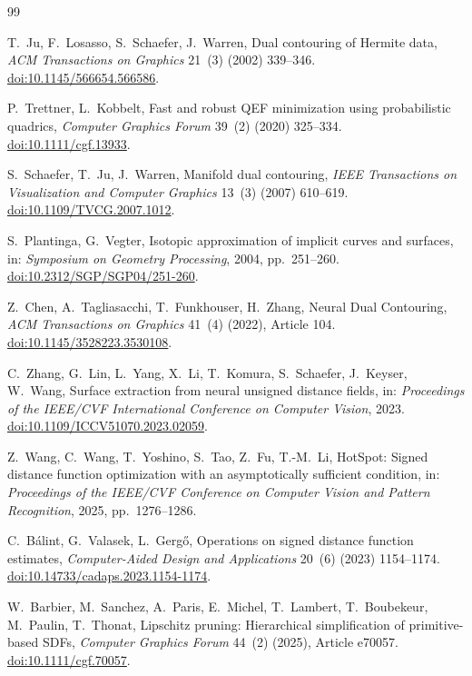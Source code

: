 \documentclass[11pt]{article}
\theoremstyle{definition}
\begin{document}
\begin{thebibliography}{99}

T.~Ju, F.~Losasso, S.~Schaefer, J.~Warren,
Dual contouring of Hermite data,
\emph{ACM Transactions on Graphics} 21~(3) (2002) 339--346.
\href{https://doi.org/10.1145/566654.566586}{doi:10.1145/566654.566586}.

P.~Trettner, L.~Kobbelt,
Fast and robust QEF minimization using probabilistic quadrics,
\emph{Computer Graphics Forum} 39~(2) (2020) 325--334.
\href{https://doi.org/10.1111/cgf.13933}{doi:10.1111/cgf.13933}.

S.~Schaefer, T.~Ju, J.~Warren,
Manifold dual contouring,
\emph{IEEE Transactions on Visualization and Computer Graphics} 13~(3)
(2007) 610--619.
\href{https://doi.org/10.1109/TVCG.2007.1012}{doi:10.1109/TVCG.2007.1012}.

S.~Plantinga, G.~Vegter,
Isotopic approximation of implicit curves and surfaces,
in: \emph{Symposium on Geometry Processing}, 2004, pp.~251--260.
\href{https://doi.org/10.2312/SGP/SGP04/251-260}{doi:10.2312/SGP/SGP04/251-260}.

Z.~Chen, A.~Tagliasacchi, T.~Funkhouser, H.~Zhang,
Neural Dual Contouring,
\emph{ACM Transactions on Graphics} 41~(4) (2022), Article 104.
\href{https://doi.org/10.1145/3528223.3530108}{doi:10.1145/3528223.3530108}.

C.~Zhang, G.~Lin, L.~Yang, X.~Li, T.~Komura, S.~Schaefer, J.~Keyser,
W.~Wang,
Surface extraction from neural unsigned distance fields,
in: \emph{Proceedings of the IEEE/CVF International Conference on Computer
Vision}, 2023.
\href{https://doi.org/10.1109/ICCV51070.2023.02059}{doi:10.1109/ICCV51070.2023.02059}.

Z.~Wang, C.~Wang, T.~Yoshino, S.~Tao, Z.~Fu, T.-M.~Li,
HotSpot: Signed distance function optimization with an asymptotically
sufficient condition,
in: \emph{Proceedings of the IEEE/CVF Conference on Computer Vision and
Pattern Recognition}, 2025, pp.~1276--1286.

C.~B\'alint, G.~Valasek, L.~Gerg\H{o},
Operations on signed distance function estimates,
\emph{Computer-Aided Design and Applications} 20~(6) (2023) 1154--1174.
\href{https://doi.org/10.14733/cadaps.2023.1154-1174}{doi:10.14733/cadaps.2023.1154-1174}.

W.~Barbier, M.~Sanchez, A.~Paris, E.~Michel, T.~Lambert, T.~Boubekeur,
M.~Paulin, T.~Thonat,
Lipschitz pruning: Hierarchical simplification of primitive-based SDFs,
\emph{Computer Graphics Forum} 44~(2) (2025), Article e70057.
\href{https://doi.org/10.1111/cgf.70057}{doi:10.1111/cgf.70057}.


\end{thebibliography}
\end{document}

